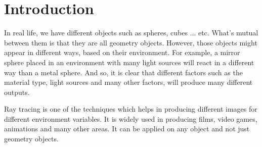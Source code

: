 \documentclass[a4paper]{article}
\begin{document}
	\section{Introduction}
	
	In real life, we have different objects such as spheres, cubes ... etc. What's mutual between them is that they are all geometry objects. However, those objects might appear in different ways, based on their environment. For example, a mirror sphere placed in an environment with many light sources will react in a different way than a metal sphere. And so, it is clear that different factors such as the material type, light sources and many other factors, will produce many different outputs. \\
	\par Ray tracing is one of the techniques which helps in producing different images for different environment variables. It is widely used in producing films, video games, animations and many other areas. It can be applied on any object and not just geometry objects.
\end{document}
